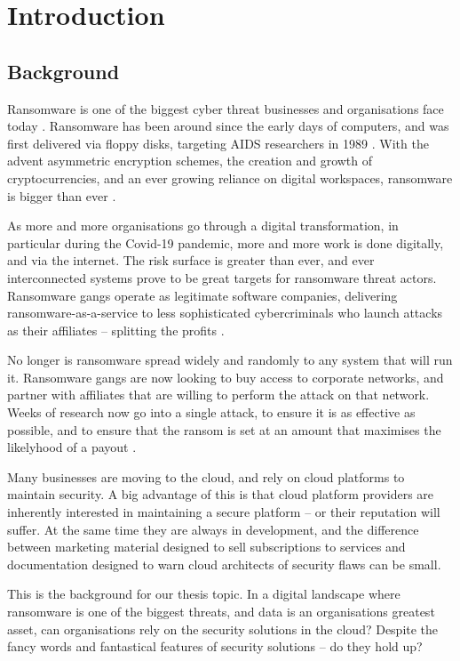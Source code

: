 \chapter{Introduction}

\section{Background}
Ransomware is one of the biggest cyber threat businesses and organisations face today \cite{hassan_ransomware_2019}. Ransomware has been around since the early days of computers, and was first delivered via floppy disks, targeting AIDS researchers in 1989 \cite{waddell_computer_2016}. With the advent asymmetric encryption schemes, the creation and growth of cryptocurrencies, and an ever growing reliance on digital workspaces, ransomware is bigger than ever \cite{noauthor_threat_nodate}.

As more and more organisations go through a digital transformation, in particular during the Covid-19 pandemic, more and more work is done digitally, and via the internet. The risk surface is greater than ever, and ever interconnected systems prove to be great targets for ransomware threat actors. Ransomware gangs operate as legitimate software companies, delivering ransomware-as-a-service to less sophisticated cybercriminals who launch attacks as their affiliates -- splitting the profits \cite{noauthor_threat_nodate}. 

No longer is ransomware spread widely and randomly to any system that will run it. Ransomware gangs are now looking to buy access to corporate networks, and partner with affiliates that are willing to perform the attack on that network. Weeks of research now go into a single attack, to ensure it is as effective as possible, and to ensure that the ransom is set at an amount that maximises the likelyhood of a payout \cite{seals_2021_nodate}.

Many businesses are moving to the cloud, and rely on cloud platforms to maintain security. A big advantage of this is that cloud platform providers are inherently interested in maintaining a secure platform -- or their reputation will suffer. At the same time they are always in development, and the difference between marketing material designed to sell subscriptions to services and documentation designed to warn cloud architects of security flaws can be small. 

This is the background for our thesis topic. In a digital landscape where ransomware is one of the biggest threats, and data is an organisations greatest asset, can organisations rely on the security solutions in the cloud? Despite the fancy words and fantastical features of security solutions -- do they hold up? 

